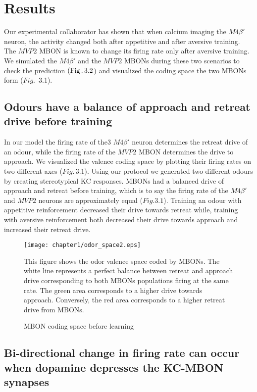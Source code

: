 \chapter{Results}

Our experimental collaborator has shown that when calcium imaging
the $M4\beta'$ neuron, the activity changed both after appetitive
and after aversive training. The $MVP2$ MBON is known to change its
firing rate only after aversive training. We simulated the $M4\beta'$
and the $MVP2$ MBONs during these two scenarios to check the prediction
$(\mbox{Fig\,.\,3.2}$) and visualized the coding space the two MBONs
form ($Fig$.~3.1).


\section{Odours have a balance of approach and retreat drive before training}

In our model the firing rate of the3 $M4\beta'$  neuron determines
the retreat drive of an odour, while the firing rate of the $MVP2$
MBON determines the drive to approach. We visualized the valence coding
space by plotting their firing rates on two different axes ($Fig.\,3.1$).
Using our protocol we generated two different odours by creating stereotypical
KC responses. MBONs had a balanced drive of approach and retreat before
training, which is to say the firing rate of the $M4\beta'$  and
$MVP2$ neurons are approximately equal ($Fig.3.1$). Training an
odour with appetitive reinforcement decreased their drive towards
retreat while, training with aversive reinforcement both decreased
their drive towards approach and increased their retreat drive.


\begin{figure}[H]
%
\texttt{[image: chapter1/odor\_space2.eps]}


\caption[MBON coding space before learning]{%
MBON coding space before learning %
}

This figure shows the odor valence space coded by MBONs. The white
line represents a perfect balance between retreat and approach drive
corresponding to both MBONs populations firing at the same rate. The
green area corresponds to a higher drive towards approach. Conversely,
the red area corresponds to a higher retreat drive from MBONs. %
\end{figure}

\section{Bi-directional change in firing rate can occur when dopamine depresses
the KC-MBON synapses}

